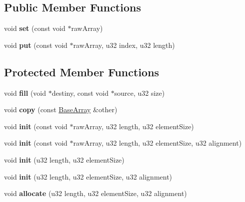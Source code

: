 \subsection*{Public Member Functions}
\begin{DoxyCompactItemize}
\item 
void {\bfseries set} (const void $\ast$raw\+Array)\hypertarget{classDE_1_1BaseArray_ac34bf7fbd622389f7f720f732eabd7be}{}\label{classDE_1_1BaseArray_ac34bf7fbd622389f7f720f732eabd7be}

\item 
void {\bfseries put} (const void $\ast$raw\+Array, u32 index, u32 length)\hypertarget{classDE_1_1BaseArray_ae064c6a309ec65f3dd3f4ece358c1fd0}{}\label{classDE_1_1BaseArray_ae064c6a309ec65f3dd3f4ece358c1fd0}

\end{DoxyCompactItemize}
\subsection*{Protected Member Functions}
\begin{DoxyCompactItemize}
\item 
void {\bfseries fill} (void $\ast$destiny, const void $\ast$source, u32 size)\hypertarget{classDE_1_1BaseArray_aa22f000b05b0b9e04f295f8e326dac6d}{}\label{classDE_1_1BaseArray_aa22f000b05b0b9e04f295f8e326dac6d}

\item 
void {\bfseries copy} (const \hyperlink{classDE_1_1BaseArray}{Base\+Array} \&other)\hypertarget{classDE_1_1BaseArray_ab8c75b509b9f9e5f86a9bd9f07f176d3}{}\label{classDE_1_1BaseArray_ab8c75b509b9f9e5f86a9bd9f07f176d3}

\item 
void {\bfseries init} (const void $\ast$raw\+Array, u32 length, u32 element\+Size)\hypertarget{classDE_1_1BaseArray_a02b09bebb65ea11f5c7b4b36a93745af}{}\label{classDE_1_1BaseArray_a02b09bebb65ea11f5c7b4b36a93745af}

\item 
void {\bfseries init} (const void $\ast$raw\+Array, u32 length, u32 element\+Size, u32 alignment)\hypertarget{classDE_1_1BaseArray_aa2769dac348aee44550c1a08d7374a2c}{}\label{classDE_1_1BaseArray_aa2769dac348aee44550c1a08d7374a2c}

\item 
void {\bfseries init} (u32 length, u32 element\+Size)\hypertarget{classDE_1_1BaseArray_a75c68b8c30583d8a14c0c433eee20749}{}\label{classDE_1_1BaseArray_a75c68b8c30583d8a14c0c433eee20749}

\item 
void {\bfseries init} (u32 length, u32 element\+Size, u32 alignment)\hypertarget{classDE_1_1BaseArray_a29b577dde57964102e4e5b358461ab73}{}\label{classDE_1_1BaseArray_a29b577dde57964102e4e5b358461ab73}

\item 
void {\bfseries allocate} (u32 length, u32 element\+Size, u32 alignment)\hypertarget{classDE_1_1BaseArray_a791cca1fbf420a3b24653800faa6fa80}{}\label{classDE_1_1BaseArray_a791cca1fbf420a3b24653800faa6fa80}

\end{DoxyCompactItemize}
